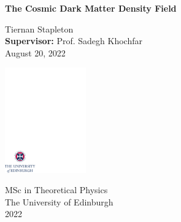\documentclass[12pt,a4paper]{report}
\begin{document}
\thispagestyle{empty}

%

\parindent=0pt          %
\parskip=5pt            %


\vspace*{0.1\textheight}

\begin{center}
        \huge{\bfseries The Cosmic Dark Matter Density Field}\\
\end{center}

\bigskip

\begin{center}
        \large{Tiernan Stapleton}\\  %
        \small{\textbf{Supervisor:} Prof. Sadegh Khochfar}\\
        \bigskip
        \large{August 20, 2022}  %
\end{center}


\vspace*{0.3\textheight}

\begin{center}
        \includegraphics[width=35mm]{crest.pdf}
\end{center}

\medskip

\begin{center}

\large{
  MSc in Theoretical Physics\\[0.8ex]
  The University of Edinburgh\\[0.8ex]
  2022
}

\end{center}
\end{document}
